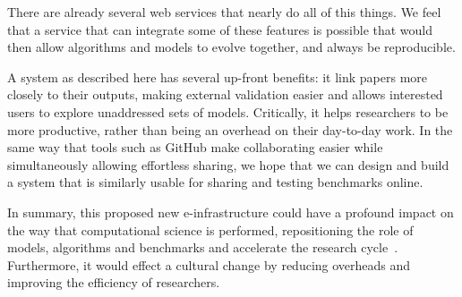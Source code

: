 \documentclass[conference]{IEEEtran}
\begin{document}
There are already several web services that nearly do all of this
things. We feel that a service that can integrate some of these
features is possible that would then allow algorithms and models to
evolve together, and always be reproducible.

A system as described here has several up-front benefits: it link
papers more closely to their outputs, making external validation
easier and allows interested users to explore unaddressed sets of
models. Critically, it helps researchers to be more productive, rather
than being an overhead on their day-to-day work. In the same way that
tools such as GitHub make collaborating easier while simultaneously
allowing effortless sharing, we hope that we can design and build a
system that is similarly usable for sharing and testing benchmarks
online.

In summary, this proposed new e-infrastructure could have a profound
impact on the way that computational science is performed,
repositioning the role of models, algorithms and benchmarks and
accelerate the research cycle~\cite{hey:2009}. Furthermore, it would
effect a cultural change by reducing overheads and improving the
efficiency of researchers.





\end{document}
